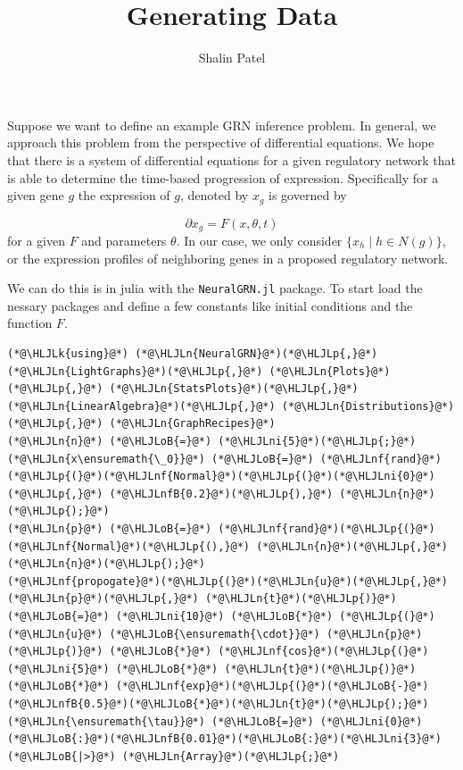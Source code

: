 \documentclass[12pt,a4paper]{article}
\title{ Generating Data }
\author{ Shalin Patel }
\newcommand{\HLJLk}[1]{\textcolor[RGB]{148,91,176}{\textbf{#1}}}
\newcommand{\HLJLn}[1]{#1}
\newcommand{\HLJLnf}[1]{\textcolor[RGB]{66,102,213}{#1}}
\newcommand{\HLJLnfB}[1]{\textcolor[RGB]{59,151,46}{#1}}
\newcommand{\HLJLni}[1]{\textcolor[RGB]{59,151,46}{#1}}
\newcommand{\HLJLoB}[1]{\textcolor[RGB]{102,102,102}{\textbf{#1}}}
\newcommand{\HLJLp}[1]{#1}
\begin{document}
\maketitle

Suppose we want to define an example GRN inference problem. In general, we approach this problem from the perspective of differential equations. We hope that there is a system of differential equations for a given regulatory network that is able to determine the time-based progression of expression. Specifically for a given gene $g$ the expression of $g$, denoted by $x_g$ is governed by

\[
\partial x_g = F(x, \theta, t)
\]
for a given $F$ and parameters $\theta$. In our case, we only consider $\{x_{h} \mid h \in N(g)\}$, or the expression profiles of neighboring genes in a proposed regulatory network.

We can do this is in julia with the \texttt{NeuralGRN.jl} package. To start load the nessary packages and define a few constants like initial conditions and the function $F$.


\begin{lstlisting}
(*@\HLJLk{using}@*) (*@\HLJLn{NeuralGRN}@*)(*@\HLJLp{,}@*) (*@\HLJLn{LightGraphs}@*)(*@\HLJLp{,}@*) (*@\HLJLn{Plots}@*)(*@\HLJLp{,}@*) (*@\HLJLn{StatsPlots}@*)(*@\HLJLp{,}@*) (*@\HLJLn{LinearAlgebra}@*)(*@\HLJLp{,}@*) (*@\HLJLn{Distributions}@*)(*@\HLJLp{,}@*) (*@\HLJLn{GraphRecipes}@*)
(*@\HLJLn{n}@*) (*@\HLJLoB{=}@*) (*@\HLJLni{5}@*)(*@\HLJLp{;}@*)
(*@\HLJLn{x\ensuremath{\_0}}@*) (*@\HLJLoB{=}@*) (*@\HLJLnf{rand}@*)(*@\HLJLp{(}@*)(*@\HLJLnf{Normal}@*)(*@\HLJLp{(}@*)(*@\HLJLni{0}@*)(*@\HLJLp{,}@*) (*@\HLJLnfB{0.2}@*)(*@\HLJLp{),}@*) (*@\HLJLn{n}@*)(*@\HLJLp{);}@*)
(*@\HLJLn{p}@*) (*@\HLJLoB{=}@*) (*@\HLJLnf{rand}@*)(*@\HLJLp{(}@*)(*@\HLJLnf{Normal}@*)(*@\HLJLp{(),}@*) (*@\HLJLn{n}@*)(*@\HLJLp{,}@*) (*@\HLJLn{n}@*)(*@\HLJLp{);}@*)
(*@\HLJLnf{propogate}@*)(*@\HLJLp{(}@*)(*@\HLJLn{u}@*)(*@\HLJLp{,}@*) (*@\HLJLn{p}@*)(*@\HLJLp{,}@*) (*@\HLJLn{t}@*)(*@\HLJLp{)}@*) (*@\HLJLoB{=}@*) (*@\HLJLni{10}@*) (*@\HLJLoB{*}@*) (*@\HLJLp{(}@*)(*@\HLJLn{u}@*) (*@\HLJLoB{\ensuremath{\cdot}}@*) (*@\HLJLn{p}@*)(*@\HLJLp{)}@*) (*@\HLJLoB{*}@*) (*@\HLJLnf{cos}@*)(*@\HLJLp{(}@*)(*@\HLJLni{5}@*) (*@\HLJLoB{*}@*) (*@\HLJLn{t}@*)(*@\HLJLp{)}@*) (*@\HLJLoB{*}@*) (*@\HLJLnf{exp}@*)(*@\HLJLp{(}@*)(*@\HLJLoB{-}@*)(*@\HLJLnfB{0.5}@*)(*@\HLJLoB{*}@*)(*@\HLJLn{t}@*)(*@\HLJLp{);}@*)
(*@\HLJLn{\ensuremath{\tau}}@*) (*@\HLJLoB{=}@*) (*@\HLJLni{0}@*)(*@\HLJLoB{:}@*)(*@\HLJLnfB{0.01}@*)(*@\HLJLoB{:}@*)(*@\HLJLni{3}@*) (*@\HLJLoB{|>}@*) (*@\HLJLn{Array}@*)(*@\HLJLp{;}@*)
\end{lstlisting}
\end{document}
